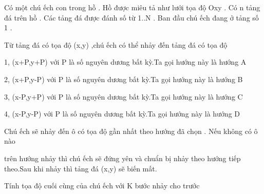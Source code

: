 Có một chú ếch con trong hồ . Hồ được miêu tả như lưới tọa độ Oxy . Có n tảng đá trên hồ . Các tảng đá được đánh số từ 1..N . Ban đầu chú ếch đang ở tảng số 1 .  

   Từ tảng đá có tọa độ (x,y) ,chú ếch có thể nhảy đến tảng đá có tọa độ  

   1, (x+P,y+P) với P là số nguyên dương bất kỳ.Ta gọi hướng này là hướng A  

   2, (x+P,y-P) với P là số nguyên dương bất kỳ.Ta gọi hướng này là hướng B  

   3, (x-P,y+P) với P là số nguyên dương bất kỳ.Ta gọi hướng này là hướng C  

   4, (x-P,y-P) với P là số nguyên dương bất kỳ.Ta gọi hướng này là hướng D  

   Chú ếch sẽ nhảy đến ô có tọa độ gần nhất theo hướng đã chọn . Nếu không có ô nào  

   trên hướng nhảy thì chú ếch sẽ đứng yên và chuẩn bị nhảy theo hướng tiếp theo.Sau khi nhảy thì tảng đá (x,y) sẽ biến mất.  

   Tính tọa độ cuối cùng của chú ếch với K bước nhảy cho trước  

\